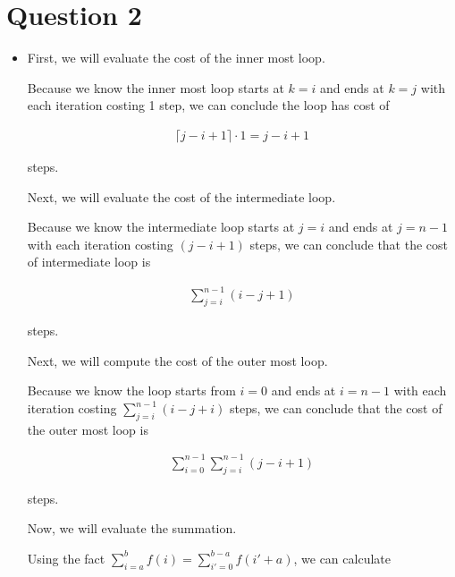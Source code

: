 \documentclass[12pt]{article}
\begin{document}
\section*{Question 2}
\begin{itemize}
    \item

    First, we will evaluate the cost of the inner most loop.

    \bigskip

    Because we know the inner most loop starts at $k = i$ and ends at $k = j$ with each
    iteration costing 1 step, we can conclude the loop has cost of

    \setcounter{equation}{0}
    \begin{align}
        \lceil j - i + 1 \rceil \cdot 1 = j - i + 1
    \end{align}

    steps.

    \bigskip

    Next, we will evaluate the cost of the intermediate loop.

    \bigskip

    Because we know the intermediate loop starts at $j = i$ and ends at $j = n - 1$
    with each iteration costing $(j - i + 1)$ steps, we can conclude that the cost of
    intermediate loop is

    \begin{align}
        \sum\limits_{j = i}^{n - 1} (i - j + 1)
    \end{align}

    steps.

    \bigskip

    Next, we will compute the cost of the outer most loop.

    \bigskip

    Because we know the loop starts from $i = 0$ and ends at $i = n - 1$ with each
    iteration costing $\sum\limits_{j = i}^{n-1} (i - j + i)$ steps, we can conclude
    that the cost of the outer most loop is

    \begin{align}
        \sum\limits_{i=0}^{n-1} \sum\limits_{j=i}^{n-1} (j - i + 1)
    \end{align}

    steps.

    \bigskip

    Now, we will evaluate the summation.

    \bigskip

    Using the fact $\sum\limits_{i=a}^{b} f(i) = \sum\limits_{i'=0}^{b-a} f(i' + a)$,
    we can calculate


\end{itemize}
\end{document}
